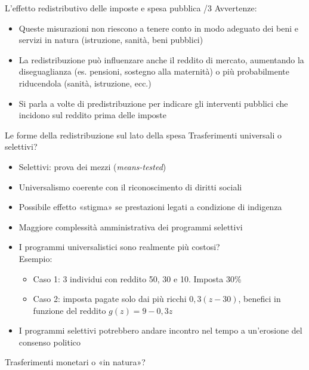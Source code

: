 \documentclass[aspectratio=64,11pt]{beamer}
\begin{document}
\begin{frame}{L'effetto redistributivo delle imposte e spesa pubblica /3}
Avvertenze:
\begin{itemize}
\item Queste misurazioni non riescono a tenere conto in modo adeguato dei beni e servizi in natura (istruzione, sanità, beni pubblici)
\item La redistribuzione può influenzare anche il reddito di mercato, aumentando la diseguaglianza (es. pensioni, sostegno alla maternità) o più probabilmente riducendola (sanità, istruzione, ecc.)
\item Si parla a volte di \alert{predistribuzione} per indicare gli interventi pubblici che incidono sul reddito prima delle imposte
\end{itemize}
\end{frame}

\begin{frame}{Le forme della redistribuzione sul lato della spesa}
Trasferimenti universali o selettivi?
\begin{itemize}
\item Selettivi: prova dei mezzi (\emph{means-tested})
\item Universalismo coerente con il riconoscimento di diritti sociali
\item Possibile effetto «stigma» se prestazioni legati a condizione di indigenza
\item Maggiore complessità amministrativa dei programmi selettivi
\item I programmi universalistici sono realmente più costosi?\\[0pt]
Esempio:
\begin{itemize}
\item Caso 1: 3 individui con reddito 50, 30 e 10. Imposta 30\%
\item Caso 2: imposta pagate solo dai più ricchi $0,3(z-30)$, benefici in funzione del reddito $g(z)=9-0,3z$
\end{itemize}
\item I programmi selettivi potrebbero andare incontro nel tempo a un'erosione
del consenso politico
\end{itemize}
Trasferimenti monetari o «in natura»?
\end{frame}
\end{document}
